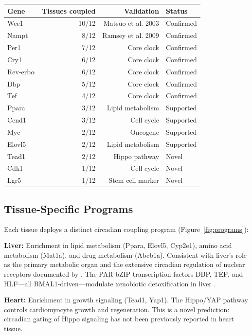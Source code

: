 \documentclass[11pt,letterpaper]{article}
\begin{document}
\begin{center}
\begin{tabular}{lrrl}
\toprule
\textbf{Gene} & \textbf{Tissues coupled} & \textbf{Validation} & \textbf{Status} \\
\midrule
Wee1 & 10/12 & Matsuo et al. 2003 & Confirmed \\
Nampt & 8/12 & Ramsey et al. 2009 & Confirmed \\
Per1 & 7/12 & Core clock & Confirmed \\
Cry1 & 6/12 & Core clock & Confirmed \\
Rev-erb$\alpha$ & 6/12 & Core clock & Confirmed \\
Dbp & 5/12 & Core clock & Confirmed \\
Tef & 4/12 & Core clock & Confirmed \\
Ppara & 3/12 & Lipid metabolism & Supported \\
Ccnd1 & 3/12 & Cell cycle & Supported \\
Myc & 2/12 & Oncogene & Supported \\
Elovl5 & 2/12 & Lipid metabolism & Supported \\
Tead1 & 2/12 & Hippo pathway & Novel \\
Cdk1 & 1/12 & Cell cycle & Novel \\
Lgr5 & 1/12 & Stem cell marker & Novel \\
\bottomrule
\end{tabular}
\end{center}

\subsection{Tissue-Specific Programs}

Each tissue deploys a distinct circadian coupling program (Figure~\ref{fig:programs}):

\textbf{Liver:} Enrichment in lipid metabolism (Ppara, Elovl5, Cyp2e1), amino acid metabolism (Mat1a), and drug metabolism (Abcb1a). Consistent with liver's role as the primary metabolic organ and the extensive circadian regulation of nuclear receptors documented by \citet{yang2006nuclear}. The PAR bZIP transcription factors DBP, TEF, and HLF---all BMAL1-driven---modulate xenobiotic detoxification in liver \citep{gachon2006parbzip}.

\textbf{Heart:} Enrichment in growth signaling (Tead1, Yap1). The Hippo/YAP pathway controls cardiomyocyte growth and regeneration. This is a novel prediction: circadian gating of Hippo signaling has not been previously reported in heart tissue.
\end{document}
